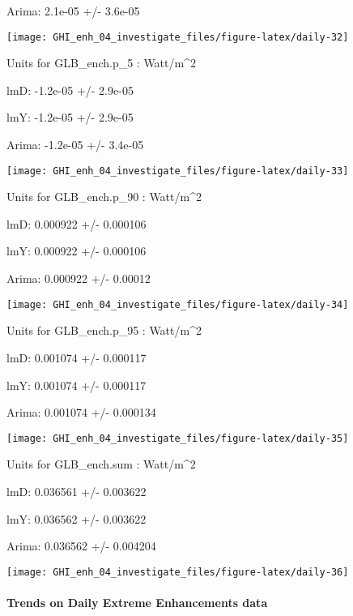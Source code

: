 \documentclass[
  10pt,
  a4paper,oneside]{article}
\begin{document}
Arima: 2.1e-05 +/- 3.6e-05

\begin{center}\texttt{[image: GHI\_enh\_04\_investigate\_files/figure-latex/daily-32]} \end{center}

Units for GLB\_ench.p\_5 : Watt/m\^{}2

lmD: -1.2e-05 +/- 2.9e-05

lmY: -1.2e-05 +/- 2.9e-05

Arima: -1.2e-05 +/- 3.4e-05

\begin{center}\texttt{[image: GHI\_enh\_04\_investigate\_files/figure-latex/daily-33]} \end{center}

Units for GLB\_ench.p\_90 : Watt/m\^{}2

lmD: 0.000922 +/- 0.000106

lmY: 0.000922 +/- 0.000106

Arima: 0.000922 +/- 0.00012

\begin{center}\texttt{[image: GHI\_enh\_04\_investigate\_files/figure-latex/daily-34]} \end{center}

Units for GLB\_ench.p\_95 : Watt/m\^{}2

lmD: 0.001074 +/- 0.000117

lmY: 0.001074 +/- 0.000117

Arima: 0.001074 +/- 0.000134

\begin{center}\texttt{[image: GHI\_enh\_04\_investigate\_files/figure-latex/daily-35]} \end{center}

Units for GLB\_ench.sum : Watt/m\^{}2

lmD: 0.036561 +/- 0.003622

lmY: 0.036562 +/- 0.003622

Arima: 0.036562 +/- 0.004204

\begin{center}\texttt{[image: GHI\_enh\_04\_investigate\_files/figure-latex/daily-36]} \end{center}

\newpage

\hypertarget{trends-on-daily-extreme-enhancements-data}{%
\paragraph{Trends on Daily Extreme Enhancements data}\label{trends-on-daily-extreme-enhancements-data}}
\end{document}
